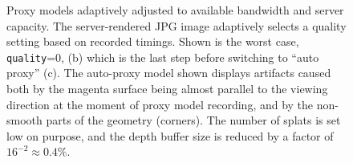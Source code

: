 \begin{figure}[htb]
  \centering
  \caption{\label{fig:adapativeProxyModels} Proxy models adaptively adjusted to
           available bandwidth and server capacity. The server-rendered JPG
           image adaptively selects a quality setting based on recorded
           timings. Shown is the worst case, \texttt{quality}=0, (b) which is
           the last step before switching to ``auto proxy'' (c). The auto-proxy
           model shown displays artifacts caused both by the magenta surface
           being almost parallel to the viewing direction at the moment of proxy
           model recording, and by the non-smooth parts of the geometry
           (corners). The number of splats is set low on purpose, and the depth
           buffer size is reduced by a factor of $16^{-2} \approx 0.4\%$.}
\end{figure}




